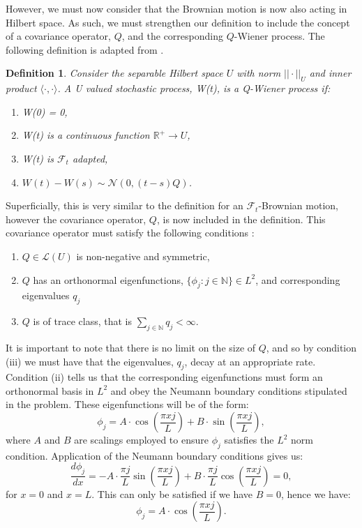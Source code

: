 \documentclass[12pt]{article}
\newtheorem{definition}{Definition}[section]
\begin{document}
However, we must now consider that the Brownian motion is now also acting in Hilbert space. As such, we must strengthen our definition to include the concept of a covariance operator, $Q$, and the corresponding $Q$-Wiener process. The following definition is adapted from \cite{Lord}.
\begin{definition} \cite{Lord}
Consider the separable Hilbert space $U$ with norm $||\cdot||_U$ and inner product $\langle \cdot,\cdot\rangle$. A U valued stochastic process, W(t), is a Q-Wiener process if:
\begin{enumerate}
    \item [(i)] W(0) = 0, 
    \item[(ii)] W(t) is a continuous function $\mathbb{R}^+\rightarrow U$,
    \item[(iii)] W(t) is $\mathcal{F}_t$ adapted,
    \item [(iv)] $W(t) - W(s) \sim \mathcal{N}(0, (t-s)Q)$.
\end{enumerate}
\end{definition}

Superficially, this is very similar to the definition for an $\mathcal{F}_t$-Brownian motion, however the covariance operator, $Q$, is now included in the definition. This covariance operator must satisfy the following conditions \cite{Lord}: 

\begin{enumerate}
    \item [(i)] $Q \in \mathcal{L}(U)$ is non-negative and symmetric,
    \item [(ii)] $Q$ has an orthonormal eigenfunctions, $\lbrace\phi_j:j\in \mathbb{N}\rbrace \in L^2$, and corresponding eigenvalues $q_j$
    \item [(iii)] $Q$ is of trace class, that is $\sum_{j\in\mathbb{N}}q_j < \infty$.
\end{enumerate}

It is important to note that there is no limit on the size of $Q$, and so by condition (iii) we must have that the eigenvalues, $q_j$, decay at an appropriate rate. Condition (ii) tells us that the corresponding eigenfunctions must form an orthonormal basis in $L^2$ and obey the Neumann boundary conditions stipulated in the problem. These eigenfunctions will be of the form:
\begin{equation*}
    \phi_j = A \cdot \cos\left(\frac{\pi xj}{L}\right) + B\cdot\sin\left(\frac{\pi xj}{L}\right),
\end{equation*}
where $A$ and $B$ are scalings employed to ensure $\phi_j$ satisfies the $L^2$ norm condition. Application of the Neumann boundary conditions gives us:
\begin{equation*}
    \frac{d\phi_j}{dx} = -A\cdot\frac{\pi j}{L}\sin\left(\frac{\pi xj}{L}\right) + B\cdot \frac{\pi j}{L}\cos\left(\frac{\pi xj}{L}\right) = 0,
\end{equation*}
for $x = 0$ and $x = L$. This can only be satisfied if we have $B=0$, hence we have:
\begin{equation*}
    \phi_j = A \cdot \cos\left(\frac{\pi xj}{L}\right).
\end{equation*}
\end{document}
